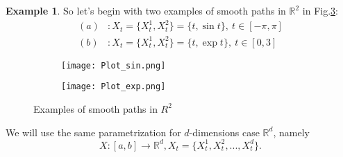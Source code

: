\documentclass[12pt,a4paper]{report}
\theoremstyle{definition}
\newtheorem{example}{Example}
\begin{document}
\begin{example}
	So let's begin with two examples of smooth paths in $\mathbb{R}^2$ in Fig.\ref{fig:smooth}:
	\begin{equation}
			\begin{aligned}
		(a)&: X_t=\{X_t^1,X_t^2\}=\{t, \sin t\}, \: t\in [-\pi,\pi]\\
			(b)&: X_t=\{X_t^1,X_t^2\}=\{t, \exp t\}, \: t\in [0,3]
		\end{aligned}
	\end{equation}

	\begin{figure}[!htbp]
		\centering
		\begin{subfigure}{0.5\textwidth}
			\centering
			\texttt{[image: Plot\_sin.png]}
			\caption{}
			\label{fig:sub1}
		\end{subfigure}%
		\begin{subfigure}{0.5\textwidth}
			\centering
			\texttt{[image: Plot\_exp.png]}
			\caption{}
			\label{fig:sub2}
		\end{subfigure}
		\caption{Examples of smooth paths in $R^2$}
		\label{fig:smooth}
	\end{figure}


\end{example}

We will use the same parametrization for $d$-dimensions case $\mathbb{R}^d$, namely
\begin{equation}
	X:[a,b]\rightarrow\mathbb{R}^d,  X_t=\{X_t^{1},X_t^{2},...,X_t^{d}\}.
\end{equation}
\end{document}
